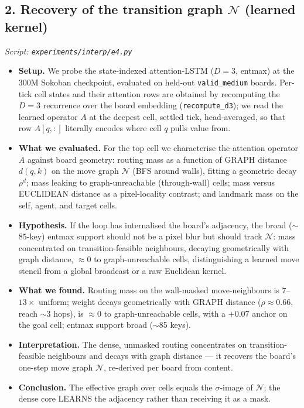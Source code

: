 \documentclass[11pt]{article}
\begin{document}
\subsection*{2. Recovery of the transition graph $\mathcal N$ (learned kernel)}
\textit{Script: \texttt{experiments/interp/e4.py}}
\begin{itemize}
\item \textbf{Setup.} We probe the state-indexed attention-LSTM ($D=3$, entmax) at the $300$M Sokoban checkpoint, evaluated on held-out \texttt{valid\_medium} boards. Per-tick cell states and their attention rows are obtained by recomputing the $D=3$ recurrence over the board embedding (\texttt{recompute\_d3}); we read the learned operator $A$ at the deepest cell, settled tick, head-averaged, so that row $A[q,:]$ literally encodes where cell $q$ pulls value from.
\item \textbf{What we evaluated.} For the top cell we characterise the attention operator $A$ against board geometry: routing mass as a function of GRAPH distance $d(q,k)$ on the move graph $\mathcal N$ (BFS around walls), fitting a geometric decay $\rho^{d}$; mass leaking to graph-unreachable (through-wall) cells; mass versus EUCLIDEAN distance as a pixel-locality contrast; and landmark mass on the self, agent, and target cells.
\item \textbf{Hypothesis.} If the loop has internalised the board's adjacency, the broad ($\sim$$85$-key) entmax support should not be a pixel blur but should track $\mathcal N$: mass concentrated on transition-feasible neighbours, decaying geometrically with graph distance, $\approx 0$ to graph-unreachable cells, distinguishing a learned move stencil from a global broadcast or a raw Euclidean kernel.
\item \textbf{What we found.} Routing mass on the wall-masked move-neighbours is $7$--$13\times$ uniform; weight decays geometrically with GRAPH distance ($\rho\approx0.66$, reach $\sim$3 hops), is $\approx0$ to graph-unreachable cells, with a $+0.07$ anchor on the goal cell; entmax support broad ($\sim$85 keys).
\item \textbf{Interpretation.} The dense, unmasked routing concentrates on transition-feasible neighbours and decays with graph distance --- it recovers the board's one-step move graph $\mathcal N$, re-derived per board from content.
\item \textbf{Conclusion.} The effective graph over cells equals the $\sigma$-image of $\mathcal N$; the dense core LEARNS the adjacency rather than receiving it as a mask.
\end{itemize}
\clearpage
\end{document}
